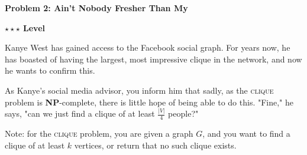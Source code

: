 \documentclass{article}\usepackage[utf8]{inputenc}\usepackage[margin=0.4cm,top=0.4cm,bottom=0.4cm]{geometry}\usepackage[usenames,dvipsnames,svgnames,table]{xcolor}
\begin{document}
\vspace{-2mm}\noindent\begin{mybox}{\begin{center}\textbf{\color{black}Problem 2: Ain't Nobody Fresher Than My}\end{center}}\end{mybox}\vspace{-2mm}
\begin{myboxot}\noindent\textbf{$\star\star\star$ Level}\end{myboxot} 

\noindent Kanye West has gained access to the Facebook social graph. For years now, he has boasted of having the
largest, most impressive clique in the network, and now he wants to confirm this.

\vspace{4pt}\noindent As Kanye's social media advisor, you inform him that sadly, as the \textsc{clique} problem is \textbf{NP}-complete, there is little hope of being able to do this. "Fine," he says, "can we just find a clique of at least $\frac{|V|}4$ people?"

\vspace{4pt}\noindent Note: for the \textsc{clique} problem, you are given a graph $G$, and you want to find a clique of at least $k$ vertices, or return that no such clique exists.
\end{document}
